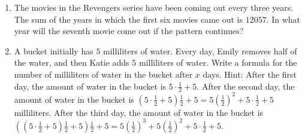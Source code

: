 \documentclass{article}
\begin{document}
\begin{enumerate}
\begin{enumerate}
            \vspace{3cm}
        \end{enumerate}
        \item The movies in the Revengers series have been coming out every
        three years. The sum of the years in which the first six movies came out
        is $12057$. In what year will the seventh movie come out if the pattern
        continues?
        \vspace{3cm}
        \item A bucket initially has $5$ milliliters of water. Every day, Emily
        removes half of the water, and then Katie adds $5$ milliliters of water.
        Write a formula for the number of milliliters of water in the bucket
        after $x$ days. Hint: After the first day, the amount of water in the
        bucket is $5 \cdot \frac{1}{2} + 5$. After the second day, the amount of
        water in the bucket is $\left(5 \cdot \frac{1}{2} + 5\right)\frac{1}{2}
        + 5 = 5\left(\frac{1}{2}\right)^2 + 5 \cdot \frac{1}{2} + 5$
        milliliters. After the third day, the amount of water in the bucket is
        $\left(\left(5 \cdot \frac{1}{2} + 5\right)\frac{1}{2} +
        5\right)\frac{1}{2} + 5 = 5\left(\frac{1}{2}\right)^3 +
        5\left(\frac{1}{2}\right)^2 + 5 \cdot \frac{1}{2} + 5$.
        \vspace{3cm}
    \end{enumerate}
\end{document}
